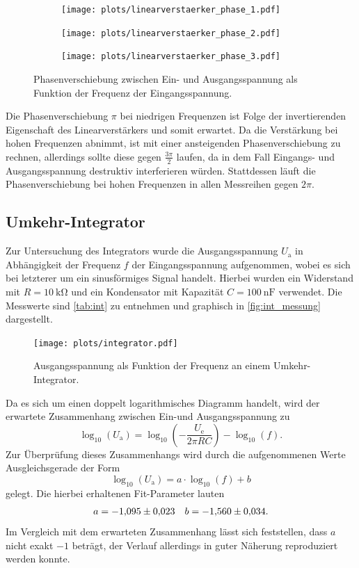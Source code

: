 \begin{figure}[H]
  \centering
  \begin{subfigure}{.4\textwidth}
    \texttt{[image: plots/linearverstaerker\_phase\_1.pdf]}
  \end{subfigure}
  \begin{subfigure}{.4\textwidth}
    \texttt{[image: plots/linearverstaerker\_phase\_2.pdf]}
  \end{subfigure}
  \begin{subfigure}{.4\textwidth}
    \texttt{[image: plots/linearverstaerker\_phase\_3.pdf]}
  \end{subfigure}
  \caption{Phasenverschiebung zwischen Ein- und Ausgangsspannung als Funktion der Frequenz der Eingangsspannung.}
  \label{fig:phase}
\end{figure}
Die Phasenverschiebung $\pi$ bei niedrigen Frequenzen ist Folge der invertierenden Eigenschaft des Linearverstärkers und somit erwartet. Da die Verstärkung bei hohen Frequenzen abnimmt, ist mit einer ansteigenden Phasenverschiebung zu rechnen, allerdings sollte diese gegen $\frac{3\pi}{2}$ laufen, da in dem Fall Eingangs- und Ausgangsspannung destruktiv interferieren würden. Stattdessen läuft die Phasenverschiebung bei hohen Frequenzen in allen Messreihen gegen $2\pi$.

\subsection{Umkehr-Integrator}
Zur Untersuchung des Integrators wurde die Ausgangsspannung $U_\mathrm{a}$ in Abhängigkeit der Frequenz $f$ der Eingangsspannung aufgenommen, wobei es sich bei letzterer um ein sinusförmiges Signal handelt. Hierbei wurden ein Widerstand mit $R = \SI{10}{\kilo\ohm}$ und ein Kondensator mit Kapazität $C = \SI{100}{\nano\farad}$ verwendet. Die Messwerte sind \autoref{tab:int} zu entnehmen und graphisch in \autoref{fig:int_messung} dargestellt.

\begin{figure}[H]
  \centering
  \texttt{[image: plots/integrator.pdf]}
  \caption{Ausgangsspannung als Funktion der Frequenz an einem Umkehr-Integrator.}
  \label{fig:int_messung}
\end{figure}
Da es sich um einen doppelt logarithmisches Diagramm handelt, wird der erwartete Zusammenhang zwischen Ein-und Ausgangsspannung zu
\begin{equation*}
  \log_{10} (U_\mathrm{a}) = \log_{10} (- \frac{U_\mathrm{e}}{2\pi R C}) - \log_{10} (f).
\end{equation*}
Zur Überprüfung dieses Zusammenhangs wird durch die aufgenommenen Werte Ausgleichsgerade der Form
\begin{equation*}
  \log_{10} (U_\mathrm{a}) = a \cdot \log_{10} (f) + b
\end{equation*}
gelegt. Die hierbei erhaltenen Fit-Parameter lauten
\begin{align*}
  a = \num{-1.095 \pm 0.023} && b = \num{-1.560 \pm 0.034}.
\end{align*}
Im Vergleich mit dem erwarteten Zusammenhang lässt sich feststellen, dass $a$ nicht exakt $-1$ beträgt, der Verlauf allerdings in guter Näherung reproduziert werden konnte.

